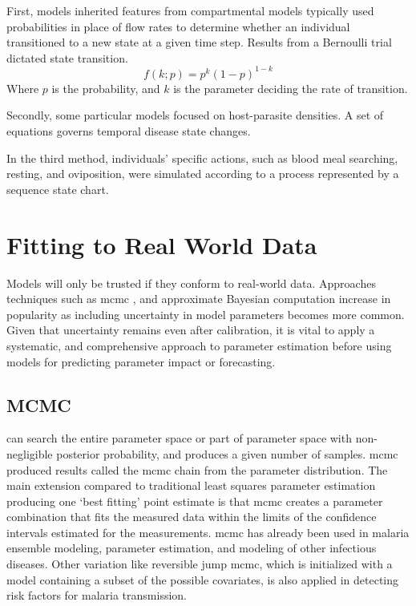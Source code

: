 \documentclass[a4paper, 12pt, twoside]{report}
\begin{document}
First, models inherited features from compartmental models typically used probabilities in place of flow rates to determine whether an individual transitioned to a new state at a given time step.
Results from a Bernoulli trial dictated state transition.
\begin{equation}
	f(k;p) = p^k ( 1 - p )^{1 - k}
\end{equation}
Where $p$ is the probability, and  $k$ is the parameter deciding the rate of transition.

Secondly, some particular models focused on host-parasite densities.
A set of equations governs temporal disease state changes.

In the third method, individuals' specific actions, such as blood meal searching, resting, and oviposition, were simulated according to a process represented by a sequence state chart.

\section{Fitting to Real World Data}
Models will only be trusted if they conform to real-world data.
Approaches techniques such as \gls{mcmc} \cite{Hastings1970}, and approximate Bayesian computation increase in popularity as including uncertainty in model parameters becomes more common.
Given that uncertainty remains even after calibration, it is vital to apply a systematic, and comprehensive approach to parameter estimation before using models for predicting parameter impact or forecasting.

\subsection{MCMC}%
\label{par:mcmc}
can search the entire parameter space or part of parameter space with non-negligible posterior probability, and produces a given number of samples.
\gls{mcmc} produced results called the \gls{mcmc} chain from the parameter distribution.
The main extension compared to traditional least squares parameter estimation producing one `best fitting’ point estimate is that \gls{mcmc} creates a parameter combination that fits the measured data within the limits of the confidence intervals estimated for the measurements.
\gls{mcmc} has already been used in malaria ensemble modeling\cite{Cameron2015,Penny2015,Penny2015a}, parameter estimation, and modeling of other infectious diseases.
Other variation like reversible jump \gls{mcmc}, which is initialized with a model containing a subset of the possible covariates, is also applied in detecting risk factors for malaria transmission\cite{Millar2018a}.
\end{document}
